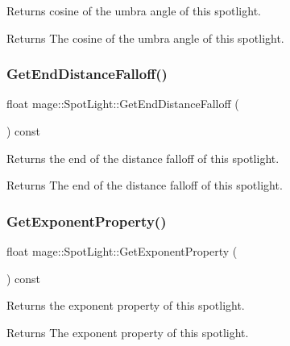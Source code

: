 Returns cosine of the umbra angle of this spotlight.

\begin{DoxyReturn}{Returns}
The cosine of the umbra angle of this spotlight. 
\end{DoxyReturn}
\hypertarget{classmage_1_1_spot_light_a4d1d2c3a5f5b2a01e6e625d84eb588d1}{}\label{classmage_1_1_spot_light_a4d1d2c3a5f5b2a01e6e625d84eb588d1} 
\subsubsection{\texorpdfstring{Get\+End\+Distance\+Falloff()}{GetEndDistanceFalloff()}}
{\footnotesize\ttfamily float mage\+::\+Spot\+Light\+::\+Get\+End\+Distance\+Falloff (\begin{DoxyParamCaption}{ }\end{DoxyParamCaption}) const\hspace{0.3cm}{\ttfamily [noexcept]}}

Returns the end of the distance falloff of this spotlight.

\begin{DoxyReturn}{Returns}
The end of the distance falloff of this spotlight. 
\end{DoxyReturn}
\hypertarget{classmage_1_1_spot_light_a0e92cc6201e2b9c8b2eb06c50a53ae13}{}\label{classmage_1_1_spot_light_a0e92cc6201e2b9c8b2eb06c50a53ae13} 
\subsubsection{\texorpdfstring{Get\+Exponent\+Property()}{GetExponentProperty()}}
{\footnotesize\ttfamily float mage\+::\+Spot\+Light\+::\+Get\+Exponent\+Property (\begin{DoxyParamCaption}{ }\end{DoxyParamCaption}) const\hspace{0.3cm}{\ttfamily [noexcept]}}

Returns the exponent property of this spotlight.

\begin{DoxyReturn}{Returns}
The exponent property of this spotlight. 
\end{DoxyReturn}
\hypertarget{classmage_1_1_spot_light_a041dfc4fd7729d8d954f19af9debb3d1}{}\label{classmage_1_1_spot_light_a041dfc4fd7729d8d954f19af9debb3d1} 
